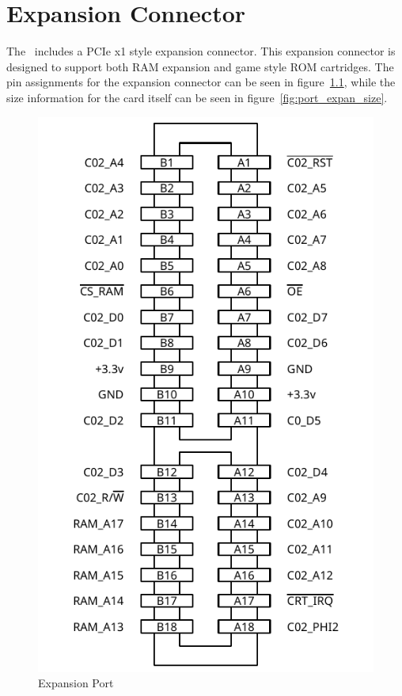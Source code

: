 \chapter{Expansion Connector}


The \jr\ includes a PCIe x1 style expansion connector. This expansion connector is designed to support both RAM expansion and game style ROM cartridges. The pin assignments for the expansion connector can be seen in figure~\ref{fig:port_expansion}, while the size information for the card itself can be seen in figure~\ref{fig:port_expan_size}.

\begin{figure}[ht]
    \begin{center}
        \includegraphics[scale=0.65]{images/f256_port_expansion.pdf}
    \end{center}
    \caption{Expansion Port}
    \label{fig:port_expansion}
\end{figure}

